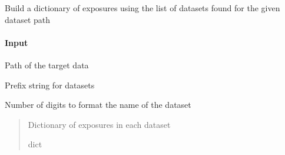 \documentclass[letterpaper,10pt,english]{sphinxmanual}
\begin{document}
\begin{fulllineitems}
\label{\detokenize{api/pymusepipe:pymusepipe.util_pipe.build_dict_exposures}}
\pysigstartsignatures
{}
\pysigstopsignatures
\sphinxAtStartPar
Build a dictionary of exposures using the list of datasets found for the
given dataset path


\paragraph{Input}
\label{\detokenize{api/pymusepipe:id162}}\begin{description}
\sphinxAtStartPar
Path of the target data

\sphinxAtStartPar
Prefix string for datasets

\sphinxAtStartPar
Number of digits to format the name of the dataset

\end{description}
\begin{quote}\begin{description}
\sphinxAtStartPar
{} \textendash{} Dictionary of exposures in each dataset

\sphinxAtStartPar
dict

\end{description}\end{quote}

\end{fulllineitems}


\begin{fulllineitems}
\label{\detokenize{api/pymusepipe:pymusepipe.util_pipe.check_filter_list}}
\pysigstartsignatures
{}
\pysigstopsignatures
\end{fulllineitems}
\end{document}

